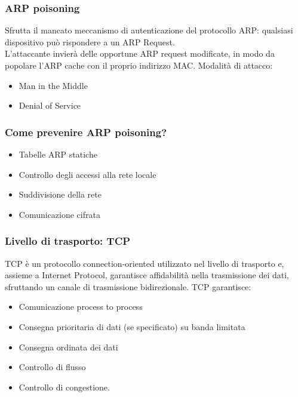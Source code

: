 \documentclass[aspectratio=169]{beamer}
\begin{document}
    \begin{frame}
        \frametitle{ARP poisoning}
        Sfrutta il mancato meccanismo di autenticazione del protocollo ARP: qualsiasi dispositivo può rispondere a un ARP Request.\\
        L'attaccante invierà delle opportune ARP request modificate, in modo da popolare l'ARP cache con il proprio indirizzo MAC.
        \vskip 0.5cm
        Modalità di attacco:
        \begin{itemize}
            \item Man in the Middle
            \item Denial of Service
        \end{itemize}
    \end{frame}
    
    \begin{frame}
        \frametitle{Come prevenire ARP poisoning?}
        \begin{itemize}
            \item Tabelle ARP statiche
            \item Controllo degli accessi alla rete locale
            \item Suddivisione della rete
            \item Comunicazione cifrata
        \end{itemize}
    \end{frame}
    
    \begin{frame}
        \frametitle{Livello di trasporto: TCP}
        TCP è un protocollo connection-oriented utilizzato nel livello di trasporto e, assieme a Internet Protocol, garantisce affidabilità nella trasmissione dei dati, sfruttando un canale di trasmissione bidirezionale.
        \vskip 0.3cm
        TCP garantisce:
        \begin{itemize}
            \item Comunicazione process to process
            \item Consegna prioritaria di dati (se specificato) su banda limitata
            \item Consegna ordinata dei dati
            \item Controllo di flusso
            \item Controllo di congestione.
        \end{itemize}
    \end{frame}
    
\end{document}
